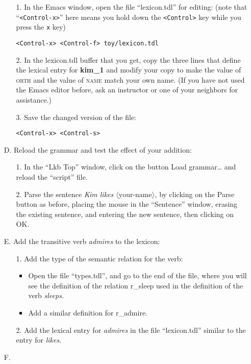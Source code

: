\documentclass[10pt]{article}
\begin{document}
\begin{itemize}
\begin{itemize}
\item[1.] In the Emacs window, open the file ``lexicon.tdl'' for editing:
(note that ``\texttt{<Con\-trol-x>}'' here means you hold down the
\texttt{<Control>} key while you press the \texttt{x} key)
\par\texttt{<Control-x> <Control-f> toy/lexicon.tdl}
\item[2.] In the lexicon.tdl buffer that you get, copy the three lines that
define the lexical entry for \textbf{kim\_1} and modify your copy to make the
value of \textsc{orth} and the value of \textsc{name} match your own name.
(If you have not used the Emacs editor before, ask an instructor or one of
your neighbors for assistance.)
\item[3.] Save the changed version of the file:
\par\texttt{<Control-x> <Control-s>}
\end{itemize}
\item[D.] Reload the grammar and test the effect of your addition:
\begin{itemize}
\item[1.] In the ``Lkb Top'' window, click on the button \textsf{Load
grammar\ldots} and reload the ``script'' file.
\item[2.] Parse the sentence \emph{Kim likes
$\langle\mbox{your-name}\rangle$,} by clicking on the \textsf{Parse}
button as before, placing the mouse in the ``Sentence'' window,
erasing the existing sentence, and entering the new sentence, then
clicking on \textsf{OK}.
\end{itemize}
\item[E.] Add the transitive verb \emph{admires} to the lexicon:
\begin{itemize}
\item[1.] Add the type of the semantic relation for the verb:
\begin{itemize}
\item Open the file ``types.tdl'', and go to the end of the file, where you
will see the definition of the relation \textsf{r\_sleep} used in the definition of
the verb \emph{sleeps.} 
\item Add a similar definition for \textsf{r\_admire}.
\end{itemize}
\item[2.] Add the lexical entry for \emph{admires} in the file ``lexicon.tdl''
similar to the entry for \emph{likes.}
\end{itemize}
\item[F.]

\end{itemize}
\end{document}

